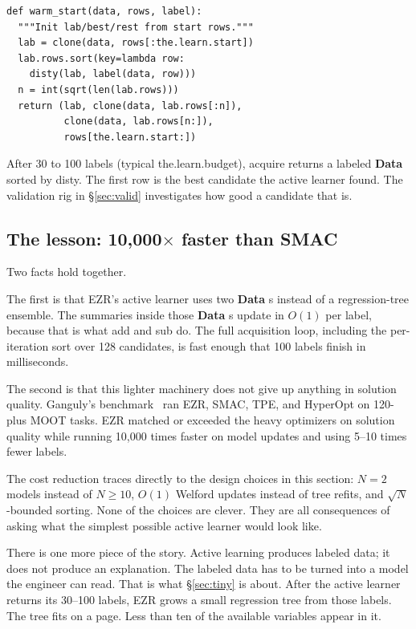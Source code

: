 \documentclass[AMA,STIX2COL]{WileyNJDv5}
\newcommand{\IT}{{\sffamily EZR}}
\newcommand{\cls}[1]{%
  \setlength{\fboxsep}{1.5pt}%
  \colorbox{clsbg}{\sffamily\bfseries{#1}}%
}
\begin{document}
\begin{verbatim}
def warm_start(data, rows, label):
  """Init lab/best/rest from start rows."""
  lab = clone(data, rows[:the.learn.start])
  lab.rows.sort(key=lambda row:
    disty(lab, label(data, row)))
  n = int(sqrt(len(lab.rows)))
  return (lab, clone(data, lab.rows[:n]),
          clone(data, lab.rows[n:]),
          rows[the.learn.start:])
\end{verbatim}

After 30 to 100 labels (typical \textsf{the.learn.budget}),
\textsf{acquire} returns a labeled \cls{Data} sorted by
\textsf{disty}. The first row is the best candidate the active
learner found. The validation rig in \S\ref{sec:valid}
investigates how good a candidate that is.

\subsection*{The lesson: 10{,}000$\times$ faster than SMAC}

Two facts hold together.

The first is that \IT{}'s active learner uses two
\cls{Data}s instead of a regression-tree ensemble. The summaries
inside those \cls{Data}s update in $O(1)$ per label, because
that is what \textsf{add} and \textsf{sub} do. The full
acquisition loop, including the per-iteration sort over 128
candidates, is fast enough that 100 labels finish in
milliseconds.

The second is that this lighter machinery does not give up
anything in solution quality. Ganguly's
benchmark~\cite{kashin} ran \IT{}, SMAC, TPE, and HyperOpt on
120-plus MOOT tasks. \IT{} matched or exceeded the heavy
optimizers on solution quality while running 10{,}000 times
faster on model updates and using 5--10 times fewer labels.

The cost reduction traces directly to the design choices in this
section: $N=2$ models instead of $N \geq 10$, $O(1)$ Welford
updates instead of tree refits, and $\sqrt{N}$-bounded sorting.
None of the choices are clever. They are all consequences of
asking what the simplest possible active learner would look like.

There is one more piece of the story. Active learning produces
labeled data; it does not produce an explanation. The labeled
data has to be turned into a model the engineer can read. That
is what \S\ref{sec:tiny} is about. After the active learner
returns its 30--100 labels, \IT{} grows a small regression tree
from those labels. The tree fits on a page. Less than ten of
the available variables appear in it.
\end{document}
